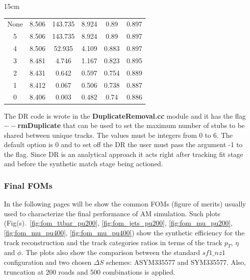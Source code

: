\begin{table}[htbp]{15cm}
\begin{tabular}{c|c|c|c|c|c}
		\hline
		None	  & 8.506 &	143.735	   & 8.924 & 0.89	   & 0.897\\
		5	      & 8.506 &	143.735	   & 8.924 & 0.89	   & 0.897\\
		4	      & 8.506 &	52.935	   & 4.109 & 0.883	   & 0.897\\
		3	      & 8.481 &	4.746	   & 1.167 & 0.823	   & 0.895\\
		2	      & 8.431 &	0.642	   & 0.597 & 0.754	   & 0.889\\
		1	      & 8.412 &	0.067	   & 0.506 & 0.738	   & 0.887\\
		0	      & 8.406 &	0.003	   & 0.482 & 0.74	   & 0.886\\
		\hline
	\end{tabular}
	\label{tab:dr_scan_tables}	
\end{table}

The DR code is wrote in the \textbf{DuplicateRemoval.cc} module and it has the flag \textbf{$--$rmDuplicate} that can be used to set the maximum number of stubs to be shared between unique tracks. The values must be integers from 0 to 6. The default option is 0 and to set off the DR the user must pass the argument -1 to the flag. Since DR is an analytical approach it acts right after tracking fit stage and before the synthetic match stage being actioned.


\subsubsection{Final FOMs}
In the following pages will be show the common FOMs (figure of merits) usually used to characterize the final performance of AM simulation. Such plots (Fig(s).~\ref{fig:fom_ttbar_pu200}, \ref{fig:fom_jets_pu200}, \ref{fig:fom_mu_pu200}, \ref{fig:fom_mu_pu400}, \ref{fig:fom_mu_pu400}) show the synthetic efficiency for the track reconstruction and the track categories ratios in terms of the track $p_{T}$, $\eta$ and $\phi$. The plots also show the comparison between the standard $sf1\_nz1$ configuration and two chosen $\Delta S$ schemes: ASYM335577 and SYM335577. Also, truncation at 200 roads and 500 combinations is applied.

